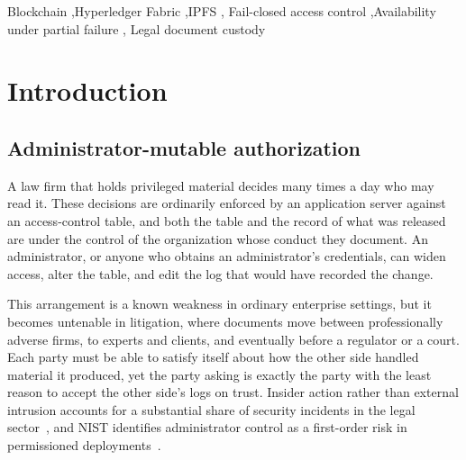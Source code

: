 \documentclass[preprint,12pt]{elsarticle}
\begin{document}
\begin{frontmatter}
\begin{abstract}
substituted in the operational identity table is refused at grant time against an
immutable ledger-anchored binding, closing what an earlier version of this work
identified as its sharpest residual risk. The
relocated decision adds 4.0 to 4.4\,ms over a database lookup, a statistically
real difference that remains well within an interactivity margin of 50\,ms fixed
before measurement, and the ordered heartbeat that bounds clock trust for grant expiry
consumes 7.84\,MB per peer per day even with no document activity.
The asymmetry follows from a design that authorizes reads against committed
state while accepting writes locally before they commit: any on-path design
sharing those two properties inherits it, whereas designs that reject
unacknowledged writes or suspend reads when ordering is unavailable do not.
\end{abstract}

\begin{keyword}
Blockchain \sep Hyperledger Fabric \sep IPFS \sep
Fail-closed access control \sep Availability under partial failure \sep
Legal document custody
\end{keyword}

\end{frontmatter}

\section{Introduction}
\label{sec:introduction}


\subsection{Administrator-mutable authorization}
\label{sec:problem}

A law firm that holds privileged material decides many times a day who may
read it. These decisions are ordinarily enforced by an application server
against an access-control table, and both the table and the record of what was
released are under the control of the organization whose conduct they document.
An administrator, or anyone who obtains an administrator's credentials, can
widen access, alter the table, and edit the log that would have recorded the
change.

This arrangement is a known weakness in ordinary enterprise settings, but it
becomes untenable in litigation, where documents move between professionally
adverse firms, to experts and clients, and eventually before a regulator or a
court. Each party must be able to satisfy itself about how the other side
handled material it produced, yet the party asking is exactly the party with
the least reason to accept the other side's logs on trust. Insider action
rather than external intrusion accounts for a substantial share of security
incidents in the legal sector~\cite{ico2024trends,aba2023}, and NIST identifies
administrator control as a first-order risk in permissioned
deployments~\cite{nistir8202}.
\end{document}
